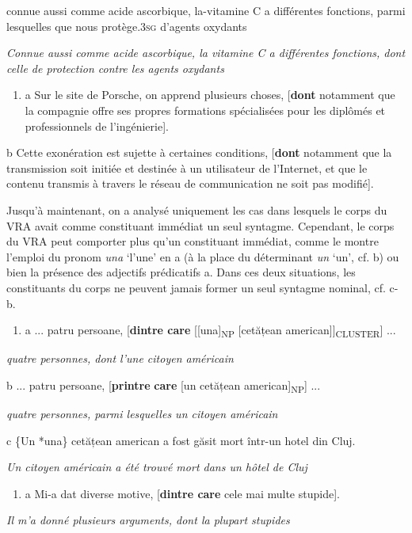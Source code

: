 connue aussi comme acide ascorbique, la-vitamine C a différentes fonctions, parmi lesquelles que nous protège.3\textsc{sg} d'agents oxydants

{\itshape
Connue aussi comme acide ascorbique, la vitamine C a différentes fonctions, dont celle de protection contre les agents oxydants} 


\begin{enumerate}
\item a  Sur le site de Porsche, on apprend plusieurs choses, [\textbf{dont} notamment que la compagnie offre ses propres formations spécialisées pour les diplômés et professionnels de l'ingénierie].


\end{enumerate}
  b  Cette exonération est sujette à certaines conditions, [\textbf{dont} notamment que la transmission soit initiée et destinée à un utilisateur de l'Internet, et que le contenu transmis à travers le réseau de communication ne soit pas modifié]. 

Jusqu'à maintenant, on a analysé uniquement les cas dans lesquels le corps du VRA avait comme constituant immédiat un seul syntagme. Cependant, le corps du VRA peut comporter plus qu'un constituant immédiat, comme le montre l'emploi du pronom \textit{una} `l'une' en a (à la place du déterminant \textit{un} `un', cf. b) ou bien la présence des adjectifs prédicatifs a. Dans ces deux situations, les constituants du corps ne peuvent jamais former un seul syntagme nominal, cf. c-b. 


\begin{enumerate}
\item \label{bkm:Ref293417995}a  ... patru persoane, [\textbf{dintre care} [[una]\textsubscript{NP} [cetățean american]]\textsubscript{CLUSTER}] ...


\end{enumerate}
{\itshape
quatre personnes, dont l'une citoyen américain}

  b  ... patru persoane, [\textbf{printre} \textbf{care} [un cetățean american]\textsubscript{NP}] ...

{\itshape
quatre personnes, parmi lesquelles un citoyen américain}

  c  \{Un {\textbar} *una\} cetățean american a fost găsit mort într-un hotel din Cluj.

{\itshape
Un citoyen américain a été trouvé mort dans un hôtel de Cluj}


\begin{enumerate}
\item \label{bkm:Ref293418658}a  Mi-a dat diverse motive, [\textbf{dintre care} cele mai multe stupide].


\end{enumerate}
{\itshape
Il m'a donné plusieurs arguments, dont la plupart stupides} 

